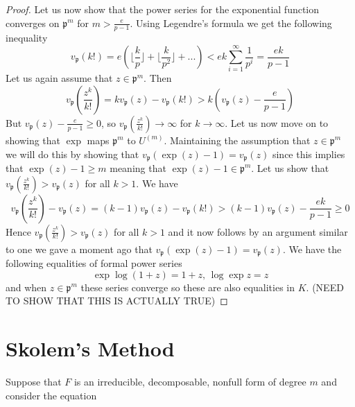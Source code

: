 \documentclass{article}
\DeclareMathOperator{\Gal}{Gal}
\newcommand{\mfrak}[1]{\mathfrak{#1}}
\newcommand{\mbb}[1]{\mathbb{#1}}
\newcommand{\vp}{{v_{\mfrak p}}}
\begin{document}
\begin{proof}
    Let us now show that the power series for the exponential function converges on $\mfrak p^m$ for $m > \frac{e}{p-1}$. Using Legendre's formula we get the following inequality
    $$\vp(k!) = e(\lfloor \frac{k}{p} \rfloor + \lfloor \frac{k}{p^2} \rfloor + ...) < ek \sum_{i=1}^\infty \frac{1}{p^i} = \frac{ek}{p-1}$$
    Let us again assume that $z \in \mfrak p^m$. Then
    $$\vp(\frac{z^k}{k!}) = k\vp(z) - \vp(k!) > k(\vp(z) - \frac{e}{p-1})$$
    But $\vp(z) - \frac{e}{p-1} \geq 0$, so $\vp(\frac{z^k}{k!}) \to \infty$ for $k \to \infty$. Let us now move on to showing that $\exp$ maps $\mfrak p^m$ to $U^{(m)}$. Maintaining the assumption that $z \in \mfrak p^m$ we will do this by showing that $\vp(\exp(z) - 1) = \vp(z)$ since this implies that $\exp(z) - 1 \geq m$ meaning that $\exp(z) - 1 \in \mfrak p^m$. Let us show that $\vp(\frac{z^k}{k!}) > \vp(z)$ for all $k > 1$. We have
    $$\vp(\frac{z^k}{k!}) - \vp(z) = (k-1)\vp(z) - \vp(k!) > (k-1)\vp(z) - \frac{ek}{p-1} \geq 0$$
    Hence $\vp(\frac{z^k}{k!}) > \vp(z)$ for all $k > 1$ and it now follows by an argument similar to one we gave a moment ago that $\vp(\exp(z) - 1) = \vp(z)$. We have the following equalities of formal power series
    $$\exp \log (1 + z) = 1 + z \text{, } \log \exp z = z$$
    and when $z \in \mfrak p^m$ these series converge so these are also equalities in $K$. (NEED TO SHOW THAT THIS IS ACTUALLY TRUE) 
\end{proof}



\section{Skolem's Method}



Suppose that $F$ is an irreducible, decomposable, nonfull form of degree $m$ and consider the equation
\end{document}
